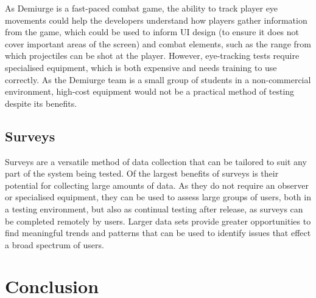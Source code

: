 \documentclass{scrartcl}
\begin{document}
As Demiurge is a fast-paced combat game, the ability to track player eye movements could help the developers understand how players gather information from the game, which could be used to inform UI design (to ensure it does not cover important areas of the screen) and combat elements, such as the range from which projectiles can be shot at the player. However, eye-tracking tests require specialised equipment, which is both expensive and needs training to use correctly. As the Demiurge team is a small group of students in a non-commercial environment, high-cost equipment would not be a practical method of testing despite its benefits.


\subsection{Surveys}
Surveys are a versatile method of data collection that can be tailored to suit any part of the system being tested. Of the largest benefits of surveys is their potential for collecting large amounts of data. As they do not require an observer or specialised equipment, they can be used to assess large groups of users, both in a testing environment, but also as continual testing after release, as surveys can be completed remotely by users. Larger data sets provide greater opportunities to find meaningful trends and patterns that can be used to identify issues that effect a broad spectrum of users.


\section{Conclusion}





\end{document}
